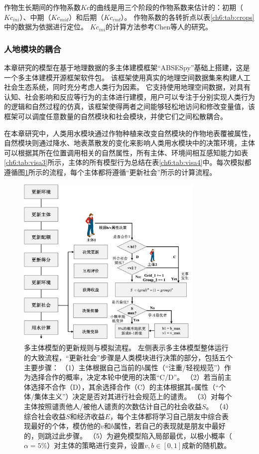 作物生长期间的作物系数$Kc$的曲线是用三个阶段的作物系数来估计的：初期（$Kc_{ini}$）、中期（$Kc_{mid}$）和后期（$Kc_{end}$）。
作物系数的各转折点以表\ref{ch6:tab:crops}中的数据为依据进行定位。
$Kc_{ini}$的计算方法参考Chen等人的研究\cite{chen2023}。

\subsubsection{人地模块的耦合}

本章研究的模型在基于地理数据的多主体建模框架“ABSESpy”基础上搭建，这是一个多主体建模开源框架软件包\cite{song2023}。
该框架使用真实的地理空间数据集来构建人工社会生态系统，同时充分考虑人类行为因素。
它支持使用地理空间数据，对具有认知、社会影响和反应等行为的主体进行建模，用户可以专注于分别实现人类行为的逻辑和自然过程的仿真，该框架使得两者之间能够轻松地访问和修改变量值，该框架可以调度任意数量的自然模块和社会模块，并使它们之间松散耦合。

在本章研究中，人类用水模块通过作物种植来改变自然模块的作物地表覆被属性，自然模块则通过降水、地表蒸散发的变化来影响人类用水模块中的决策环境，主体可以根据其所在位置调用相关的自然属性，所有主体、环境间相互感知能力如表\ref{ch6:tab:visa3}所示，主体的所有模型行为总结在表\ref{ch6:tab:visa4}中。每次模拟都遵循图\ref{ch6:fig:society}所示的流程，每个主体都将遵循``更新社会''所示的计算流程。

\begin{figure}[!ht]
    \centering
    \includegraphics[width=0.8\textwidth]{img/ch6/ch6_updates_diagram.png}
    \caption[多主体模型的更新规则与模拟流程]{多主体模型的更新规则与模拟流程。
    左侧表示多主体模型整体运行的大致流程，“更新社会”步骤是人类模块进行决策的部分，包括五个主要步骤：
        （1）主体根据自己当前的$b$属性（“注重/轻视规范”）作为选择合作的概率，决定本轮中使用的决策“C/D”。
        （2）若当前主体选择不合作（D），其余选择合作（C）的主体根据其$v$属性（“个体/集体主义”）决定是否对其进行社会规范上的谴责。
        （3）对每个主体按照谴责他人/被他人谴责的次数估计自己的社会收益$S$。
        （4）综合社会收益$S$和经济收益$E$，每个主体都将学习自己朋友中综合表现最好的个体，模仿他的$v$和$b$属性，若自己的表现就是朋友中最好的，则跳过此步骤。
        （5）为避免模型陷入局部最优，以极小概率（$\alpha = 5\%$）对主体的策略进行变异，设置$v, b \in [0, 1]$成新的随机数。
    }\label{ch6:fig:society}
\end{figure}

